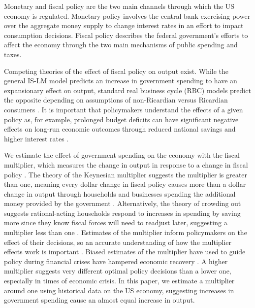 
Monetary and fiscal policy are the two main channels through which the US economy is regulated.  Monetary policy involves the central bank exercising power over the aggregate money supply to change interest rates in an effort to impact consumption decisions.  Fiscal policy describes the federal government's efforts to affect the economy through the two main mechanisms of public spending and taxes.  



Competing theories of the effect of fiscal policy on output exist.  While the general IS-LM model predicts an increase in government spending to have an expansionary effect on output, standard real business cycle (RBC) models predict the opposite depending on assumptions of non-Ricardian versus Ricardian consumers \parencite{gali2007understanding}.  It is important that policymakers understand the effects of a given policy as, for example, prolonged budget deficits can have significant negative effects on long-run economic outcomes through reduced national savings and higher interest rates \parencite{gale2003economic}.

We estimate the effect of government spending on the economy with the fiscal multiplier, which measures the change in output in response to a change in fiscal policy \parencite{spilimbergo2009fiscal}.  The theory of the Keynesian multiplier suggests the multiplier is greater than one, meaning every dollar change in fiscal policy causes more than a dollar change in output through households and businesses spending the additional money provided by the government \parencite{barro2011macroeconomic}.  Alternatively, the theory of crowding out suggests rational-acting households respond to increases in spending by saving more since they know fiscal forces will need to readjust later, suggesting a multiplier less than one \parencite{berge2021fiscal}.  Estimates of the multiplier inform policymakers on the effect of their decisions, so an accurate understanding of how the multiplier effects work is important \parencite{eyraud2013challenge}.  Biased estimates of the multiplier have used to guide policy during financial crises have hampered economic recovery \parencites{blanchard2013growth}{blanchard2014learning}.  A higher multiplier suggests very different optimal policy decisions than a lower one, especially in times of economic crisis.  In this paper, we estimate a multiplier around one using historical data on the US economy, suggesting increases in government spending cause an almost equal increase in output.

